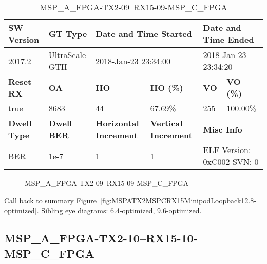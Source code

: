 \begin{table}[h]
\centering
\caption{MSP\_A\_FPGA-TX2-09--RX15-09-MSP\_C\_FPGA}
\label{tab:MSPAFPGATX209RX1509MSPCFPGA12.8-optimized}
\begin{tabular}{@{}|l|l|l|l|l|l|@{}}
\toprule
\textbf{SW Version}                & \textbf{GT Type}   & \multicolumn{2}{l|}{\textbf{Date and Time Started}}            & \multicolumn{2}{l|}{\textbf{Date and Time Ended}}        \\ \midrule
2017.2                       & UltraScale GTH          & \multicolumn{2}{l|}{2018-Jan-23 23:34:00}                   & \multicolumn{2}{l|}{2018-Jan-23 23:34:20}               \\ \midrule
\textbf{Reset RX}                  & \textbf{OA} & \textbf{HO}   & \textbf{HO (\%)} & \textbf{VO} & \textbf{VO (\%)} \\ \midrule
true & 8683        & 44          & 67.69\%        & 255        & 100.00\%       \\ \midrule
\textbf{Dwell Type}                & \textbf{Dwell BER} & \textbf{Horizontal Increment} & \textbf{Vertical Increment}    & \multicolumn{2}{l|}{\textbf{Misc Info}}                  \\ \midrule
BER                            & 1e-7        & 1        & 1           & \multicolumn{2}{l|}{ELF Version: 0xC002 SVN: 0}                         \\ \bottomrule
\end{tabular}
\end{table}

\begin{figure}[h]
\caption{MSP\_A\_FPGA-TX2-09--RX15-09-MSP\_C\_FPGA} \label{fig:MSPAFPGATX209RX1509MSPCFPGA12.8-optimized}
\end{figure}

Call back to summary Figure~\ref{fig:MSPATX2MSPCRX15MinipodLoopback12.8-optimized}.
Sibling eye diagrams: \hyperref[sec:MSPAFPGATX209RX1509MSPCFPGA6.4-optimized]{6.4-optimized}, \hyperref[sec:MSPAFPGATX209RX1509MSPCFPGA9.6-optimized]{9.6-optimized}.

\clearpage
\newpage


\subsection{MSP\_A\_FPGA-TX2-10--RX15-10-MSP\_C\_FPGA}\label{sec:MSPAFPGATX210RX1510MSPCFPGA12.8-optimized}


